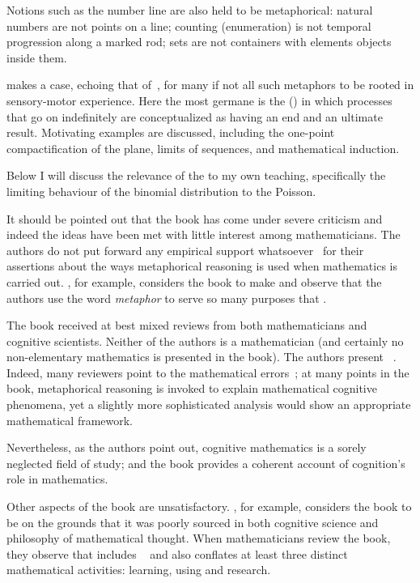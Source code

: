 Notions such as the number line are also held to be metaphorical:
natural numbers are not points on a line; counting (enumeration) is
not temporal progression along a marked rod; sets are not containers
with elements objects inside them.

\wmcf makes a case, echoing that of~, for many if not
all such metaphors to be rooted in sensory-motor experience.  Here the
most germane is the  (\bmi) in
which processes that go on indefinitely are conceptualized as having
an end and an ultimate result.  Motivating examples are discussed,
including the one-point compactification of the plane, limits of
sequences, and mathematical induction.

Below I will discuss the relevance of the \bmi to my own teaching,
specifically the limiting behaviour of the binomial distribution to
the Poisson.

It should be pointed out that the book has come under severe criticism
and indeed the ideas have been met with little interest among
mathematicians.  The authors do not put forward any empirical support
whatsoever~\parencite{madden2001} for their assertions about the ways
metaphorical reasoning is used when mathematics is carried out.
, for example, considers the book to make
 and observe that the authors
use the word \emph{metaphor} to serve so many purposes that
.

The book received at best mixed reviews from both mathematicians and
cognitive scientists.  Neither of the authors is a mathematician (and
certainly no non-elementary mathematics is presented in the book).
The authors present ~\parencite{henderson2002}.
Indeed, many reviewers point to the 
mathematical errors~\parencite{gold2001}; at many points in the book,
metaphorical reasoning is invoked to explain mathematical cognitive
phenomena, yet a slightly more sophisticated analysis would show an
appropriate mathematical framework.

Nevertheless, as the authors point out, cognitive mathematics is a
sorely neglected field of study; and the book provides a coherent
account of cognition's role in mathematics.

Other aspects of the book are unsatisfactory.  , for
example, considers the book to be  on the
grounds that it was poorly sourced in both cognitive science and
philosophy of mathematical thought.  When mathematicians review the
book, they observe that \wmcf includes ~\parencite{henderson2002} and also conflates at
least three distinct mathematical activities: learning, using and
research.

